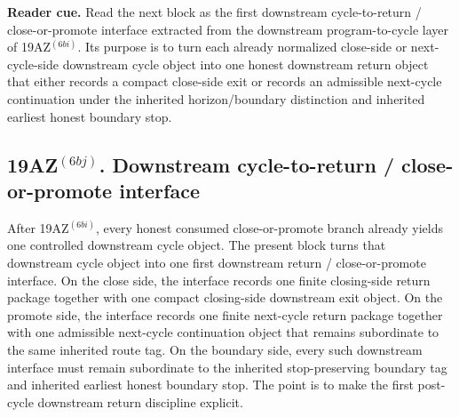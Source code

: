 \noindent\textbf{Reader cue.} Read the next block as the first downstream cycle-to-return / close-or-promote interface extracted from the downstream program-to-cycle layer of 19AZ$^{(6bi)}$. Its purpose is to turn each already normalized close-side or next-cycle-side downstream cycle object into one honest downstream return object that either records a compact close-side exit or records an admissible next-cycle continuation under the inherited horizon/boundary distinction and inherited earliest honest boundary stop.

\subsection*{19AZ$^{(6bj)}$. Downstream cycle-to-return / close-or-promote interface}
\label{sec:first-downstream-cycle-to-return-close-or-promote-interface-extracted-from-the-downstream-program-to-cycle-layer}
After 19AZ$^{(6bi)}$, every honest consumed close-or-promote branch already yields one controlled downstream cycle object. The present block turns that downstream cycle object into one first downstream return / close-or-promote interface. On the close side, the interface records one finite closing-side return package together with one compact closing-side downstream exit object. On the promote side, the interface records one finite next-cycle return package together with one admissible next-cycle continuation object that remains subordinate to the same inherited route tag. On the boundary side, every such downstream interface must remain subordinate to the inherited stop-preserving boundary tag and inherited earliest honest boundary stop. The point is to make the first post-cycle downstream return discipline explicit.


